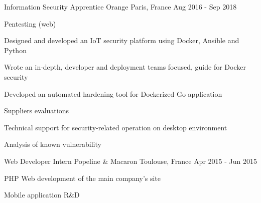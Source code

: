 

\begin{cventries}

  \cventry
    {Information Security Apprentice } %
    {Orange} %
    {Paris, France} %
    {Aug 2016 - Sep 2018} %
    {
      \begin{cvitems} %
        \item {Pentesting (web)}
        \item {Designed and developed an IoT security platform using Docker, Ansible and Python}
        \item {Wrote an in-depth, developer and deployment teams focused, guide for Docker security}
        \item {Developed an automated hardening tool for Dockerized Go application}
        \item {Suppliers evaluations}
        \item {Technical support for security-related operation on desktop environment}
        \item {Analysis of known vulnerability}
      \end{cvitems}
    }
  \cventry
    {Web Developer Intern} %
    {Popeline \& Macaron} %
    {Toulouse, France} %
    {Apr 2015 - Jun 2015} %
    {
      \begin{cvitems} %
        \item {PHP Web development of the main company's site}
        \item {Mobile application R\&D}
      \end{cvitems}
    }
\end{cventries}

